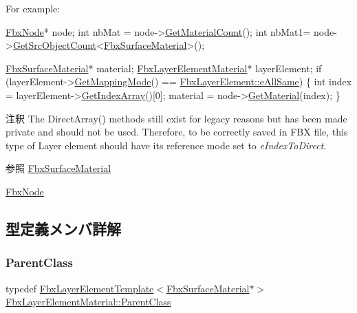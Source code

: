 For example\+:


\begin{DoxyCode}
\hyperlink{class_fbx_node}{FbxNode}* node;
\textcolor{keywordtype}{int} nbMat = node->\hyperlink{class_fbx_node_a00fabc04c839f665fa5d4a0b49859745}{GetMaterialCount}();
\textcolor{keywordtype}{int} nbMat1= node->\hyperlink{class_fbx_object_a5fce56e85d5e0568243a5df99dabb42f}{GetSrcObjectCount}<\hyperlink{class_fbx_surface_material}{FbxSurfaceMaterial}>();

\hyperlink{class_fbx_surface_material}{FbxSurfaceMaterial}* material;
\hyperlink{class_fbx_layer_element_material}{FbxLayerElementMaterial}* layerElement;
\textcolor{keywordflow}{if} (layerElement->\hyperlink{class_fbx_layer_element_a3b20bf41d0b5abc9661b8b93e033cddb}{GetMappingMode}() == \hyperlink{class_fbx_layer_element_a5a40e95db30ae9f94611dc3f1568af26ab42522efc125ff87d80ba08267a8624f}{FbxLayerElement::eAllSame})
\{
    \textcolor{keywordtype}{int} index = layerElement->\hyperlink{class_fbx_layer_element_template_ab1494495d1944eb4b20c4c97abd6358c}{GetIndexArray}()[0];
    material = node->\hyperlink{class_fbx_node_aa89bfed69b0fe26ee03708931fbda9c2}{GetMaterial}(index);
\}
\end{DoxyCode}


\begin{DoxyRemark}{注釈}
The Direct\+Array() methods still exist for legacy reasons but has been made private and should not be used. Therefore, to be correctly saved in F\+BX file, this type of Layer element should have its reference mode set to {\itshape e\+Index\+To\+Direct}.
\end{DoxyRemark}
\begin{DoxySeeAlso}{参照}
\hyperlink{class_fbx_surface_material}{Fbx\+Surface\+Material} 

\hyperlink{class_fbx_node}{Fbx\+Node} 
\end{DoxySeeAlso}


\subsection{型定義メンバ詳解}
\mbox{\label{class_fbx_layer_element_material_a8f8718ab06cb0f6a9aa82205573fa64b}} 
\subsubsection{\texorpdfstring{Parent\+Class}{ParentClass}}
{\footnotesize\ttfamily typedef \hyperlink{class_fbx_layer_element_template}{Fbx\+Layer\+Element\+Template}$<$\hyperlink{class_fbx_surface_material}{Fbx\+Surface\+Material}$\ast$$>$ \hyperlink{class_fbx_layer_element_material_a8f8718ab06cb0f6a9aa82205573fa64b}{Fbx\+Layer\+Element\+Material\+::\+Parent\+Class}}



